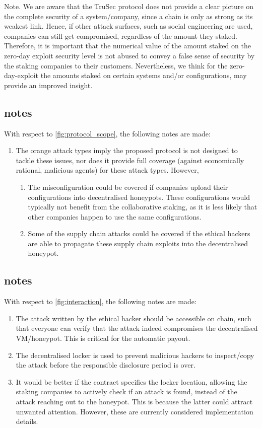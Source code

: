 Note. We are aware that the TruSec protocol does not provide a clear picture on the complete security of a system/company, since a chain is only as strong as its weakest link. Hence, if other attack surfaces, such as social engineering are used, companies can still get compromised, regardless of the amount they staked. Therefore, it is important that the numerical value of the amount staked on the zero-day exploit security level is not abused to convey a false sense of security by the staking companies to their customers. Nevertheless, we think for the zero-day-exploit the amounts staked on certain systems and/or configurations, may provide an improved insight.
\subsection{ notes}
With respect to \cref{fig:protocol_scope}, the following notes are made:
\begin{enumerate} 
    \item The orange attack types imply the proposed protocol is not designed to tackle these issues, nor does it provide full coverage (against economically rational, malicious agents) for these attack types. However,
    \begin{enumerate}
        \item The misconfiguration could be covered if companies upload their configurations into decentralised honeypots. These configurations would typically not benefit from the collaborative staking, as it is less likely that other companies happen to use the same configurations.
        \item Some of the supply chain attacks could be covered if the ethical hackers are able to propagate these supply chain exploits into the decentralised honeypot.
    \end{enumerate}
\end{enumerate}

\subsection{ notes}
With respect to \cref{fig:interaction}, the following notes are made:
\begin{enumerate} 
    \item The attack written by the ethical hacker should be accessible on chain, such that everyone can verify that the attack indeed compromises the decentralised VM/honeypot. This is critical for the automatic payout.
    \item The decentralised locker is used to prevent malicious hackers to inspect/copy the attack before the responsible disclosure period is over.
    \item It would be better if the contract specifies the locker location, allowing the staking companies to actively check if an attack is found, instead of the attack reaching out to the honeypot. This is because the latter could attract unwanted attention. However, these are currently considered implementation details.
\end{enumerate}